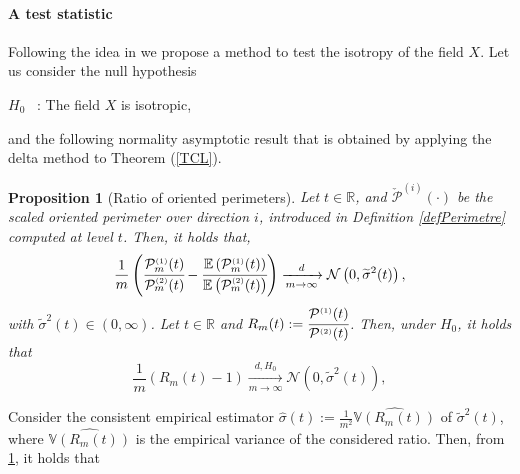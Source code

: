 \documentclass[12pt]{article}
\renewcommand{\tilde}{\widetilde}
\renewcommand{\hat}{\widehat}
\theoremstyle{Theorem}
\newtheorem{Proposition}[Theorem]{Proposition}
\begin{document}
\paragraph{A test statistic} Following the idea  in \cite{bierme2019}  we propose a method to test the isotropy of the field $X$.
Let us consider the null hypothesis
\begin{center}
  $H_{0}$ \, :\; The field $X$ is isotropic,
\end{center}
and the following normality asymptotic result that is obtained by applying the delta method to Theorem (\textcolor{blue}{\ref{TCL}}).
\begin{Proposition}[Ratio of oriented perimeters]\label{deltamethodgeneralprop} 
Let  $t \in \mathbb{R}$, and $\check{\mathcal{P}}^{\scriptscriptstyle  (i) }(\cdot)$ be the scaled oriented perimeter over direction $i$, introduced in Definition \ref{defPerimetre} computed at level $t$. Then, it holds that,
\begin{equation*}
\frac{1}{m}\left(\cfrac{\mathcal{P}^{\scriptscriptstyle  (1) }_{m}(t)}{\mathcal{P}^{\scriptscriptstyle  (2)}_{m}(t)} - \cfrac{\mathbb{E}\left(\mathcal{P}^{\scriptscriptstyle  (1) }_{m}(t)\right)}{\mathbb{E}\left(\mathcal{P}^{\scriptscriptstyle  (2)}_{m}(t)\right)} \right)  \xrightarrow[m \to \infty]{d} \mathcal{N}\left(0,  \tilde{\sigma}^{2}(t) \right),
\end{equation*}
with $\tilde{\sigma}^{2}(t) \in (0, \infty)$.
Let $t \in \mathbb{R}$  and  $R_{m}(t) := \cfrac{\mathcal{P}^{\scriptscriptstyle  (1) }(t)}{\mathcal{P}^{\scriptscriptstyle  (2) }(t)}$. Then, under $H_{0}$, it holds that
\begin{equation}\label{ratiounderH0}
\frac{1}{m}\left(R_{m}(t) - 1 \right)  \xrightarrow[m \to \infty]{d, H_0} \mathcal{N}\left(0,  \tilde{\sigma}^{2}(t)  \right),
\end{equation} 
\end{Proposition}
Consider the consistent empirical estimator $\hat{\sigma}(t):= \frac{1}{m^2}\hat{\mathbb{V}\left(R_{m}(t)\right)}$ of $\tilde{\sigma}^{2}(t)$, where $\hat{\mathbb{V}\left(R_{m}(t)\right)}$ is the empirical variance of the considered ratio. Then, from \ref{deltamethodgeneralprop}, it holds that 
\end{document}
